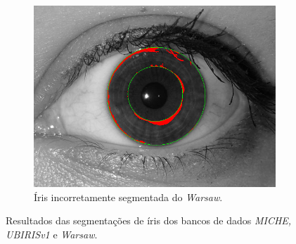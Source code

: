 \begin{figure}[H]
\begin{subfigure}{0.25\textwidth}
  \includegraphics[width=\linewidth]{img/Resultados/warsaw/warsaw_seg_ruim.jpg}
  \caption{Íris incorretamente segmentada do \textit{\acrshort{Warsaw}}.}
\end{subfigure}
\caption{Resultados das segmentações de íris dos bancos de dados \textit{MICHE, UBIRISv1} e \textit{\acrshort{Warsaw}}.}
\label{fig:experimentos:segmentacoes:todos}
\end{figure}

